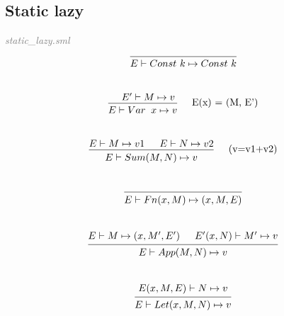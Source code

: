 \documentclass[a4paper]{article}
\begin{document}
	\subsection{Static lazy}
	\textit{\textcolor{gray}{static\_lazy.sml}} \\
	\[
		\begin{prooftree}
			\hypo{}
			\infer1[]{E \vdash Const \ k \mapsto Const \ k} 
		\end{prooftree}
	\]
	\\
	\[
		\begin{prooftree}
			\hypo{E' \vdash M \mapsto v }
			\infer1[\quad E(x) = (M, E')]{E \vdash Var &x \mapsto v}
		\end{prooftree}
	\]
	\\
	\[
		\begin{prooftree}
			\hypo{E \vdash M \mapsto v1}
			\hypo{E \vdash N \mapsto v2 }
			\infer2[\quad (v=v1+v2)]{E \vdash Sum(M, N) \mapsto v}
		\end{prooftree}
	\]
	\\
	\[
		\begin{prooftree}
			\hypo{}
			\infer1[]{E \vdash Fn(x, M) \mapsto (x, M, E)}
		\end{prooftree}
	\]
	\\
	\[
		\begin{prooftree}
			\hypo{E \vdash M \mapsto (x, M', E')}
			\hypo{E'(x, N) \vdash M' \mapsto v}
			\infer2[]{E \vdash App(M, N) \mapsto v}
		\end{prooftree}
	\]
	\\
	\[
		\begin{prooftree}
			\hypo{E(x, M, E) \vdash N \mapsto v}
			\infer1[]{E \vdash Let(x, M, N) \mapsto v}
		\end{prooftree}
	\]
	
\end{document}
